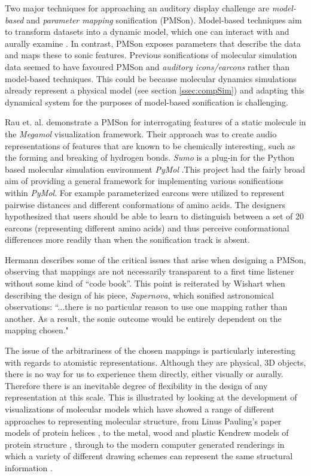 \documentclass[a4paper,10pt,oneside]{article}
\begin{document}
\begin{sloppy}
Two major techniques for approaching an auditory display challenge are \emph{model-based} and \emph{parameter mapping} sonification (PMSon). Model-based techniques aim to transform datasets into a dynamic model, which one can interact with and aurally examine \cite{Hermann1999}. In contrast, PMSon exposes parameters that describe the data and maps these to sonic features.
Previous sonifications of molecular simulation data seemed to have favoured PMSon and \emph{auditory icons/earcons} rather than model-based techniques. This could be because molecular dynamics simulations already represent a physical model (see section \ref{ssec:compSim}) and adapting this dynamical system for the purposes of model-based sonification is challenging. 

  Rau et. al. \cite{Rau2016} demonstrate a PMSon for interrogating features of a static molecule in the \emph{Megamol} \cite{Grottel2015} visualization framework. Their approach was to create audio representations of features that are known to be chemically interesting, such as the forming and breaking of hydrogen bonds.
    \emph{Sumo} \cite{Grond2008} is a plug-in for the Python based molecular simulation environment \emph{PyMol} \cite{pymol}.This project had the fairly broad aim of providing a general framework for implementing various sonifications within \emph{PyMol}. For example parameterized earcons were utilized to represent pairwise distances and different conformations of amino acids. The designers hypothesized that users should be able to learn to distinguish between a set of 20 earcons (representing  different amino acids) and thus perceive conformational differences more readily than when the sonification track is absent.

  Hermann \cite{Hermann2001} describes some of the critical issues that arise when designing a PMSon, observing that mappings are not necessarily transparent to a first time listener without some kind of ``code book''. This point is reiterated by Wishart \cite{wishart2013} when describing the design of his piece, \emph{Supernova}, which sonified astronomical observations: ``...there is no particular reason to use one mapping rather than another. As a result, the sonic outcome would be entirely dependent on the mapping chosen."

  The issue of the arbitrariness of the chosen mappings is particularly interesting with regards to atomistic representations. Although they are physical, 3D objects, there is no way for us to experience them directly, either visually or aurally. Therefore there is an inevitable degree of flexibility in the design of any representation at this scale. This is illustrated by looking at the development of visualizations of molecular models which have showed a range of different approaches to representing molecular structure, from Linus Pauling's paper models of protein helices \cite{Pauling205}, to the metal, wood and plastic Kendrew models of protein structure \cite{kendrew1958}, through to the modern computer generated renderings in which a variety of different drawing schemes can represent the same structural information \cite{HUMP96}. 
  

\end{sloppy}
\end{document}
